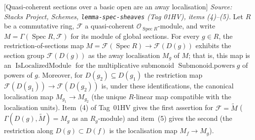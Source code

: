 \begin{definition}

[Quasi-coherent sections over a basic open are an away localisation]
  \label{def:qcoh_sections_localized}
  \textit{Source: Stacks Project, Schemes, \texttt{lemma-spec-sheaves} (Tag 01HV),
  items (4)--(5).}
  Let \(R\) be a commutative ring, \(\mathcal{F}\) a quasi-coherent
  \(\mathcal{O}_{\operatorname{Spec} R}\)-module, and write
  \(M = \Gamma(\operatorname{Spec} R, \mathcal{F})\) for its module of global
  sections. For every \(g \in R\), the restriction-of-sections map
  \(M = \mathcal{F}(\operatorname{Spec} R) \to \mathcal{F}(D(g))\) exhibits the
  section group \(\mathcal{F}(D(g))\) as the away localisation \(M_g\) of \(M\); that
  is, this map is an \(\operatorname{IsLocalizedModule}\) for the multiplicative
  submonoid \(\operatorname{Submonoid.powers} g\) of powers of \(g\). Moreover, for
  \(D(g_2) \subseteq D(g_1)\) the restriction map
  \(\mathcal{F}(D(g_1)) \to \mathcal{F}(D(g_2))\) is, under these identifications, the
  canonical localisation map \(M_{g_1} \to M_{g_2}\) (the unique \(R\)-linear map
  compatible with the localisation units). Item~(4) of Tag~01HV gives the first
  assertion for \(\mathcal{F} = \widetilde{M}\) (\(\Gamma(D(g), \widetilde{M}) = M_g\)
  as an \(R_g\)-module) and item~(5) gives the second (the restriction along
  \(D(g) \subset D(f)\) is the localisation map \(M_f \to M_g\)).


\end{definition}
